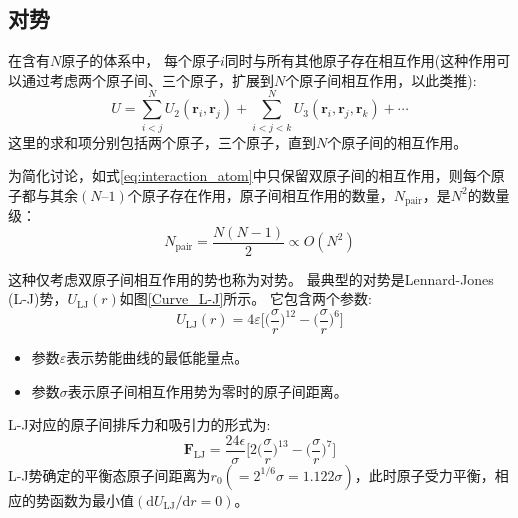 \subsection{对势}
在含有$N$原子的体系中，%
每个原子$i$同时与所有其他原子存在相互作用(这种作用可以通过考虑两个原子间、三个原子，扩展到$N$个原子间相互作用，以此类推):
\begin{equation}
	U=\sum_{i<j}^NU_2(\mathbf{r}_i,\mathbf{r}_j)+\sum_{i<j<k}^NU_3(\mathbf{r}_i,\mathbf{r}_j,\mathbf{r}_k)+\cdots
	\label{eq:interaction_atom}
\end{equation}
这里的求和项分别包括两个原子，三个原子，直到$N$个原子间的相互作用。%

为简化讨论，如式\eqref{eq:interaction_atom}中只保留双原子间的相互作用，则每个原子都与其余$(N–1)$个原子存在作用，原子间相互作用的数量，$N_{\mathrm{pair}}$，是$N^2$的数量级：
\begin{equation}
	N_{\mathrm{pair}}=\dfrac{N(N-1)}2\propto O(N^2)
	\label{eq:interaction_atom_range}
\end{equation}

这种仅考虑双原子间相互作用的势也称为对势。%
最典型的对势是\textrm{Lennard-Jones (L-J)}势\cite{PRSC106-463_1924}，$U_{\mathrm{LJ}}(r)$如图\ref{Curve_L-J}所示。%
它包含两个参数:~
\begin{equation}
	U_{\mathrm{LJ}}(r)=4\varepsilon\bigg[\bigg(\dfrac{\sigma}r\bigg)^{12}-\bigg(\dfrac{\sigma}r\bigg)^6\bigg]
	\label{eq:Potential_L-J}
\end{equation}
\begin{itemize}
	\item 参数$\varepsilon$表示势能曲线的最低能量点。%
	\item 参数$\sigma$表示原子间相互作用势为零时的原子间距离。
\end{itemize}
\textrm{L-J}对应的原子间排斥力和吸引力的形式为:~
\begin{equation}
	\mathbf{F}_{\mathrm{LJ}}=\dfrac{24\epsilon}{\sigma}\bigg[2\bigg(\dfrac{\sigma}r\bigg)^{13}-\bigg(\dfrac{\sigma}r\bigg)^7\bigg]
	\label{eq:Focrce_L-J}
\end{equation}
\textrm{L-J}势确定的平衡态原子间距离为$r_0(=2^{1/6}\sigma=1.122\sigma)$，此时原子受力平衡，相应的势函数为最小值$(\mathrm{d}U_{\mathrm{LJ}}/\mathrm{d}r=0)$。

